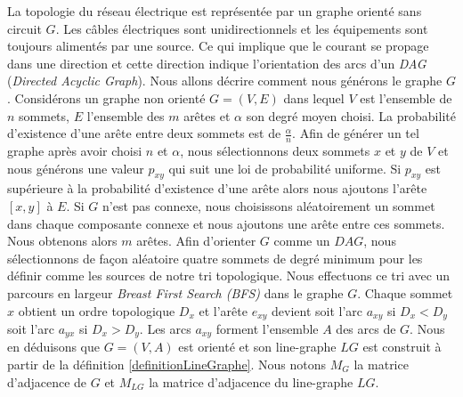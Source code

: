 La topologie du r\'eseau \'electrique est repr\'esent\'ee par un graphe orient\'e sans circuit $G$.
Les c\^ables \'electriques sont unidirectionnels et les \'equipements sont toujours aliment\'es par une source. Ce qui implique que le courant se propage dans une direction et cette direction  indique l'orientation des arcs d'un {\em DAG} ({\em Directed Acyclic Graph}).
Nous allons d\'ecrire comment nous g\'en\'erons le graphe $G$.
\newline
Consid\'erons un graphe non orient\'e $G=(V, E)$ dans lequel  $V$ est l'ensemble de $n$ sommets, $E$ l'ensemble des $m$ ar\^etes et $\alpha$ son degr\'e moyen choisi. 
La probabilit\'e d'existence d'une ar\^ete entre deux sommets est de $\frac{\alpha}{n}$. 
Afin de g\'en\'erer un tel graphe apr\`es avoir choisi $n$ et $\alpha$, nous s\'electionnons  deux sommets $x$ et $y$ de $V$ et nous g\'en\'erons une valeur $p_{xy}$ qui suit  une loi de probabilit\'e uniforme.
Si $p_{xy}$ est sup\'erieure \`a la probabilit\'e d'existence d'une ar\^ete alors nous ajoutons l'ar\^ete $[x,y]$ \`a $E$.
\newline
Si $G$ n'est pas connexe, nous choisissons al\'eatoirement un sommet dans chaque composante connexe et nous ajoutons une ar\^ete entre ces sommets.  Nous obtenons alors  $m$ ar\^etes.
\newline
Afin d'orienter $G$ comme un $DAG$, nous s\'electionnons de fa\c con al\'eatoire quatre sommets  de degr\'e minimum pour les d\'efinir comme les sources de notre tri topologique.
Nous effectuons ce tri avec un parcours en largeur {\em Breast First Search (BFS)} dans le graphe $G$. 
Chaque sommet $x$ obtient un ordre topologique $D_x$ et l'ar\^ete $e_{xy}$ devient 
soit l'arc $a_{xy}$ si $D_x < D_y$ 
soit l'arc $a_{yx}$ si $D_x > D_y$. 
Les arcs $a_{xy}$ forment l'ensemble $A$ des arcs de $G$. 
Nous en d\'eduisons que $G=(V, A)$ est orient\'e et son line-graphe $LG$ est construit \`a partir de la d\'efinition \ref{definitionLineGraphe}.
\newline
Nous notons $M_{G}$  la matrice d'adjacence de $G$ et $M_{LG}$ la matrice d'adjacence du line-graphe $LG$.

